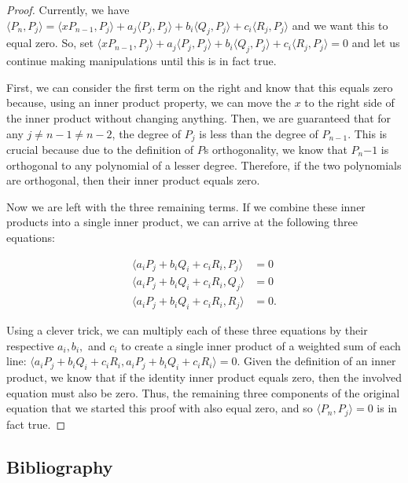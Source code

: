 \documentclass[letterpaper, 12pt]{article}
\begin{document}
\vspace*{2mm}
	\begin{proof}
	Currently, we have $\langle P_n, P_j\rangle = \langle xP_{n-1}, P_j\rangle + a_j\langle P_j, P_j\rangle + b_i\langle Q_j, P_j\rangle + c_i\langle R_j, P_j\rangle$ and we want this to equal zero. So, set $\langle xP_{n-1}, P_j\rangle + a_j\langle P_j, P_j\rangle + b_i\langle Q_j, P_j\rangle + c_i\langle R_j, P_j\rangle = 0$ and let us continue making manipulations until this is in fact true.
	
	First, we can consider the first term on the right and know that this equals zero because, using an inner product property, we can move the $x$ to the right side of the inner product without changing anything. Then, we are guaranteed that for any $j \neq n-1 \neq n-2$, the degree of $P_j$ is less than the degree of $P_{n-1}$. This is crucial because due to the definition of $P$s orthogonality, we know that $P_n{-1}$ is orthogonal to any polynomial of a lesser degree. Therefore, if the two polynomials are orthogonal, then their inner product equals zero.
	
	Now we are left with the three remaining terms. If we combine these inner products into a single inner product, we can arrive at the following three equations:
	
	\vspace*{-14mm}
	\begin{align*}
		\langle a_iP_j+b_iQ_i+c_iR_i, P_j \rangle &= 0 \\
		\langle a_iP_j+b_iQ_i+c_iR_i, Q_j \rangle &= 0\\
		\langle a_iP_j+b_iQ_i+c_iR_i, R_j \rangle &= 0.
	\end{align*}
	
	\vspace*{-5mm}
	\noindent Using a clever trick, we can multiply each of these three equations by their respective $a_i, b_i,$ and $c_i$ to create a single inner product of a weighted sum of each line: $\langle a_iP_j+b_iQ_i+c_iR_i, a_iP_j+b_iQ_i+c_iR_i\rangle = 0$. Given the definition of an inner product, we know that if the identity inner product equals zero, then the involved equation must also be zero. Thus, the remaining three components of the original equation that we started this proof with also equal zero, and so  $\langle P_n, P_j\rangle = 0$ is in fact true.
	\end{proof}







\newpage
{}
\linespread{1}\selectfont %
\begin{centering}\section*{Bibliography}\end{centering}
\nocite{*}
\vspace{2mm}
\printbibliography[heading=none]
\end{document}
